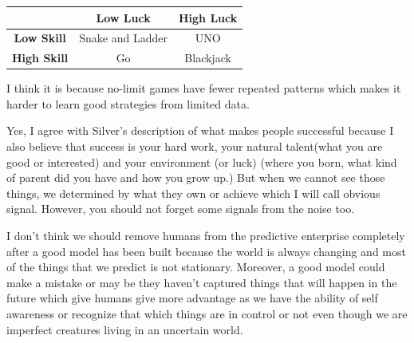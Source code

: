 \documentclass[12pt]{article}
\begin{document}
\begin{enumerate}
\begin{center}
\begin{tabular}{|c|c|c|}
\hline
 & \textbf{Low Luck} & \textbf{High Luck} \\
\hline
\textbf{Low Skill} & Snake and Ladder & UNO \\
\hline
\textbf{High Skill} & Go & Blackjack \\
\hline
\end{tabular}
\end{center}



I think it is because no-limit games have fewer repeated patterns which makes it harder to learn good strategies from limited data.


Yes, I agree with Silver's description of what makes people successful because I also believe that success is your hard work, your natural talent(what you are good or interested) and your environment (or luck) (where you born, what kind of parent did you have and how you grow up.) But when we cannot see those things, we determined by what they own or achieve which I will call obvious signal. However, you should not forget some signals from the noise too.


I don't think we should remove humans from the predictive enterprise completely after a good model has been built because the world is always changing and most of the things that we predict is not stationary. Moreover, a good model could make a mistake or may be they haven't captured things that will happen in the future which give humans give more advantage as we have the ability of self awareness or recognize that which things are in control or not even though we are imperfect creatures living in an uncertain world.



\end{enumerate}
\end{document}
